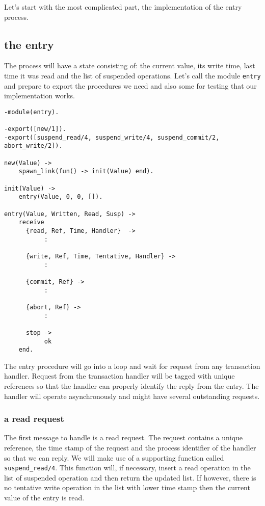 \documentclass[a4paper, 11pt]{article}
\begin{document}
Let's start with the most complicated part, the implementation of the
entry process.

\subsection{the entry}

The process will have a state consisting of: the current
value, its write time, last time it was read and the list of suspended
operations. Let's call the module {\tt entry} and prepare to export
the procedures we need and also some for testing that our implementation works.

\begin{verbatim}
-module(entry).

-export([new/1]).
-export([suspend_read/4, suspend_write/4, suspend_commit/2, abort_write/2]).

new(Value) ->
    spawn_link(fun() -> init(Value) end).

init(Value) ->
    entry(Value, 0, 0, []).

entry(Value, Written, Read, Susp) ->
    receive 
      {read, Ref, Time, Handler}  ->
           :

      {write, Ref, Time, Tentative, Handler} ->
           :

      {commit, Ref} ->
           :

      {abort, Ref} ->
           :

      stop ->
           ok
    end.
\end{verbatim}

The entry procedure will go into a loop and wait for request from any
transaction handler. Request from the transaction handler will be
tagged with unique references so that the handler can properly
identify the reply from the entry. The handler will operate
asynchronously and might have several outstanding requests.

\subsubsection{a read request}

The first message to handle is a read request. The request contains a
unique reference, the time stamp of the request and the process
identifier of the handler so that we can reply. We will make use of a
supporting function called {\tt suspend\_read/4}. This function will,
if necessary, insert a read operation in the list of suspended
operation and then return the updated list. If however, there is no
tentative write operation in the list with lower time stamp then the
current value of the entry is read.
\end{document}
